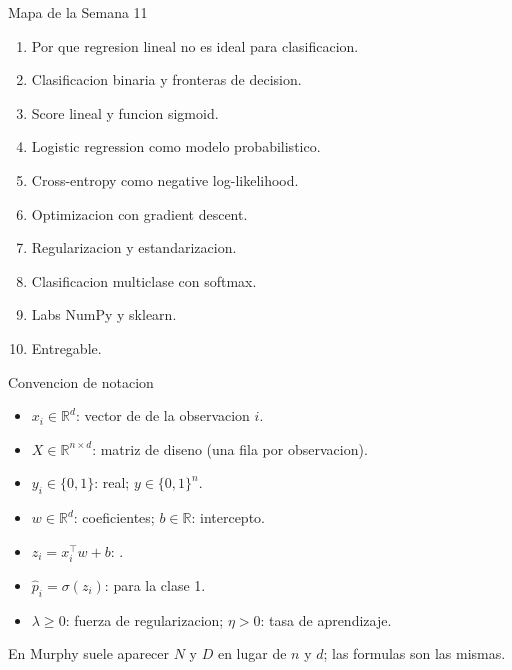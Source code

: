 \begin{frame}
  \titlepage
\end{frame}

\begin{frame}{Mapa de la Semana 11}
\begin{enumerate}\small
  \item Por que regresion lineal no es ideal para clasificacion.
  \item Clasificacion binaria y fronteras de decision.
  \item Score lineal y funcion sigmoid.
  \item Logistic regression como modelo probabilistico.
  \item Cross-entropy como negative log-likelihood.
  \item Optimizacion con gradient descent.
  \item Regularizacion y estandarizacion.
  \item Clasificacion multiclase con softmax.
  \item Labs NumPy y sklearn.
  \item Entregable.
\end{enumerate}
\end{frame}

\begin{frame}{Convencion de notacion}
\begin{itemize}\small
  \item $x_i\in\mathbb{R}^d$: vector de  de la observacion $i$.
  \item $X\in\mathbb{R}^{n\times d}$: matriz de diseno (una fila por observacion).
  \item $y_i\in\{0,1\}$:  real; $y\in\{0,1\}^n$.
  \item $w\in\mathbb{R}^d$: coeficientes; $b\in\mathbb{R}$: intercepto.
  \item $z_i = x_i^\top w + b$: .
  \item $\hat p_i = \sigma(z_i)$:  para la clase 1.
  \item $\lambda\ge 0$: fuerza de regularizacion; $\eta>0$: tasa de aprendizaje.
\end{itemize}
\vspace{0.25em}
{\footnotesize En Murphy suele aparecer $N$ y $D$ en lugar de $n$ y $d$; las formulas son las mismas.}
\end{frame}


